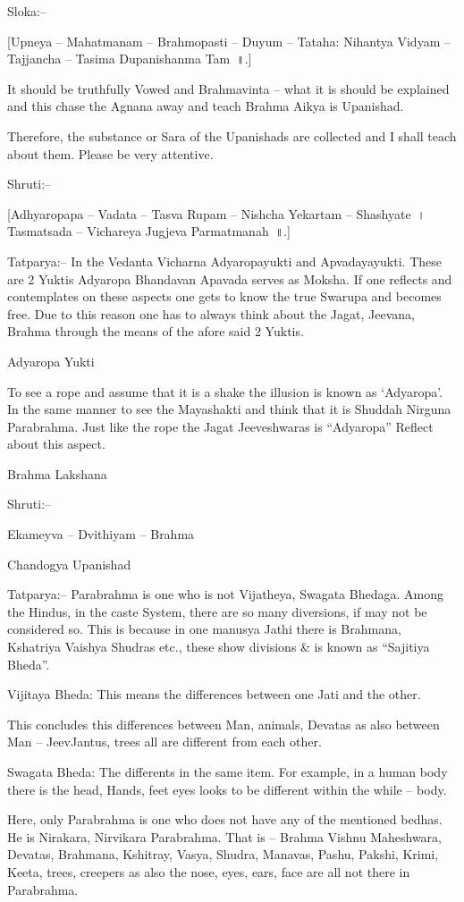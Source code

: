 Sloka:–

[Upneya – Mahatmanam – Brahmopasti – Duyum – Tataha: Nihantya Vidyam – Tajjancha – Tasima Dupanishanma Tam~॥.]

It should be truthfully Vowed and Brahmavinta – what it is should be explained and this chase the Agnana away and teach Brahma Aikya is Upanishad.

Therefore, the substance or Sara of the Upanishads are collected and I shall teach about them. Please be very attentive.

Shruti:–

[Adhyaropapa – Vadata – Tasva Rupam – Nishcha Yekartam – Shashyate~। Tasmatsada – Vichareya Jugjeva Parmatmanah~॥.]

Tatparya:– In the Vedanta Vicharna Adyaropayukti and Apvadayayukti. These are 2 Yuktis Adyaropa Bhandavan Apavada serves as Moksha. If one reflects and contemplates on these aspects one gets to know the true Swarupa and becomes free. Due to this reason one has to always think about the Jagat, Jeevana, Brahma through the means of the afore said 2 Yuktis.

Adyaropa Yukti

To see a rope and assume that it is a shake the illusion is known as ‘Adyaropa’. In the same manner to see the Mayashakti and think that it is Shuddah Nirguna Parabrahma. Just like the rope the Jagat Jeeveshwaras is “Adyaropa” Reflect about this aspect.

Brahma Lakshana

Shruti:–

Ekameyva – Dvithiyam – Brahma

Chandogya Upanishad

Tatparya:– Parabrahma is one who is not Vijatheya, Swagata Bhedaga. Among the Hindus, in the caste System, there are so many diversions, if may not be considered so. This is because in one manusya Jathi there is Brahmana, Kshatriya Vaishya Shudras etc., these show divisions \& is known as “Sajitiya Bheda”.

Vijitaya Bheda: This means the differences between one Jati and the other.

This concludes this differences between Man, animals, Devatas as also between Man – JeevJantus, trees all are different from each other.

Swagata Bheda: The differents in the same item. For example, in a human body there is the head, Hands, feet eyes looks to be different within the while – body.

Here, only Parabrahma is one who does not have any of the mentioned bedhas. He is Nirakara, Nirvikara Parabrahma. That is – Brahma Vishnu Maheshwara, Devatas, Brahmana, Kshitray, Vasya, Shudra, Manavas, Pashu, Pakshi, Krimi, Keeta, trees, creepers as also the nose, eyes, ears, face are all not there in Parabrahma.

